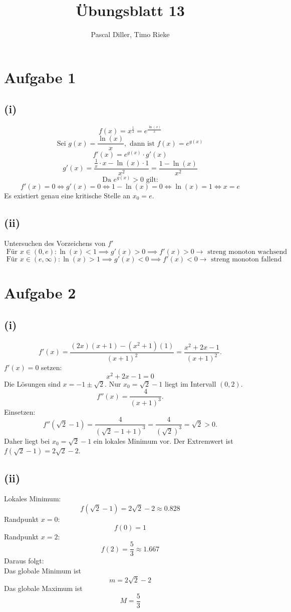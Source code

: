 \documentclass{article}
\title{Übungsblatt 13}
\author{Pascal Diller, Timo Rieke}
\begin{document}
\maketitle

\section*{Aufgabe 1}
\subsection*{(i)}
\[f(x) = x^{\frac{1}{2}} = e^{\frac{\ln(x)}{x}}\]
\[\text{Sei } g(x) = \frac{\ln(x)}{x}, \text{ dann ist } f(x) = e^{g(x)}\]
\[f'(x) = e^{g(x)} \cdot g'(x)\]
\[g'(x) = \frac{\frac{1}{x} \cdot x - \ln(x) \cdot 1}{x^2} = \frac{1 - \ln(x)}{x^2}\]
\[\text{Da } e^{g(x)} > 0 \text{ gilt:} \]
\[f'(x) = 0 \Leftrightarrow g'(x) = 0 \Leftrightarrow 1 - \ln(x) = 0 \Leftrightarrow \ln(x) = 1 \Leftrightarrow x = e\]
\[\]
Es existiert genau eine kritische Stelle an $x_0 = e$.

\subsection*{(ii)}
Untersuchen des Vorzeichens von $f'$
\[\text{ Für } x \in (0, e): \ln(x) < 1 \implies g'(x) > 0 \implies f'(x) > 0 \to \text{ streng monoton wachsend}\]
\[\text{ Für } x \in (e, \infty): \ln(x) > 1 \implies g'(x) < 0 \implies f'(x) < 0 \to \text{ streng monoton fallend}\]

\section*{Aufgabe 2}
\subsection*{(i)}
\[f'(x) = \frac{(2x)(x+1) - (x^2+1)(1)}{(x+1)^2} = \frac{x^2+2x-1}{(x+1)^2}.\]
\(f'(x) = 0\) setzen:
\[x^2+2x-1 = 0\]
Die Lösungen sind \(x = -1 \pm \sqrt{2}\). Nur \(x_0 = \sqrt{2}-1\) liegt im Intervall \((0, 2)\).
\[f''(x) = \frac{4}{(x+1)^3}.\]
Einsetzen:
\[f''(\sqrt{2}-1) = \frac{4}{(\sqrt{2}-1+1)^3} = \frac{4}{(\sqrt{2})^3} = \sqrt{2} > 0.\]
Daher liegt bei \(x_0 = \sqrt{2}-1\) ein lokales Minimum vor. Der Extremwert ist \(f(\sqrt{2}-1) = 2\sqrt{2}-2\).

\subsection*{(ii)}
Lokales Minimum: \[f(\sqrt{2}-1) = 2\sqrt{2}-2 \approx 0.828\]
Randpunkt \(x=0\): \[f(0) = 1\]
Randpunkt \(x=2\): \[f(2) = \frac{5}{3} \approx 1.667\]
Daraus folgt: \\
Das globale Minimum ist \[m = 2\sqrt{2}-2\]
Das globale Maximum ist \[M = \frac{5}{3}\]
\end{document}
